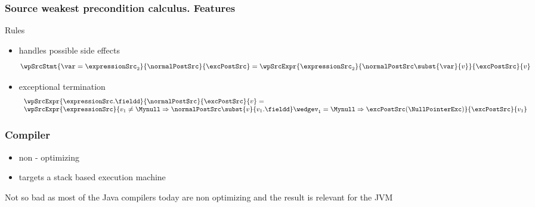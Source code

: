 \documentclass{beamer}
\begin{document}
 \begin{frame}\frametitle{Source weakest precondition calculus. Features}
    
	 \begin{block}{Rules}
	   \begin{itemize}
	      \item handles possible side effects
		{\tiny $$ \wpSrcStmt{ \var = \expressionSrc_2}{\normalPostSrc }{ \excPostSrc } =
                  \wpSrcExpr{\expressionSrc_2 }{ 
				    \normalPostSrc \subst{\var}{v}   
				   }{ \excPostSrc}{v} 
		  $$ } 
	      \item exceptional termination 
		{\tiny $$   \begin{array}{l}  \wpSrcExpr{\expressionSrc.\fieldd  }{\normalPostSrc }{ \excPostSrc }{v}  = \\
	                        \wpSrcExpr{\expressionSrc }{%
						        v_1 \neq \Mynull \Rightarrow \normalPostSrc \subst{v}{v_1.\fieldd} %
			                                \wedge%
						        v_1 = \Mynull \Rightarrow%
							       \excPostSrc(\NullPointerExc ) %
							        
						   }{%
					    \excPostSrc }{v_1}  
				\end{array} $$ }
	      
	  \end{itemize}
    \end{block}
 \end{frame}

   \begin{frame}\frametitle{Compiler}

       \begin{itemize}
           \item non - optimizing 
           \item targets a stack based execution machine
       \end{itemize}
       Not so bad as  most of the Java compilers today are non optimizing  and  the result is relevant for the JVM 
   \end{frame}
  
\end{document}
